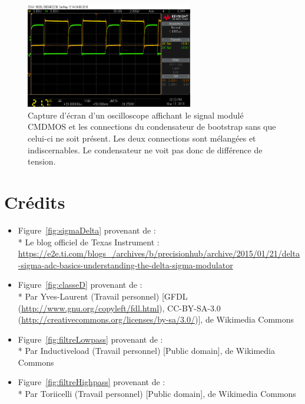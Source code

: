 \documentclass[10pt, oneside, a4paper]{article}
\begin{document}
\begin{figure}[p]
	\centering
	\includegraphics[width=0.65\textwidth]{image/12-05/scope_10.png}
	\caption{Capture d'écran d'un oscilloscope affichant le signal modulé CMDMOS et les
			 connections du condensateur de bootstrap sans que celui-ci ne soit présent.
			 Les deux connections sont mélangées et indiscernables.
			 Le condensateur ne voit pas donc de différence de tension.}
	\label{fig:scope-10}
\end{figure}


\pagebreak
{}
\section*{Crédits}

\begin{itemize}
\item Figure~\ref{fig:sigmaDelta} provenant de :\\*
Le blog officiel de Texas Instrument :
\url{https://e2e.ti.com/blogs_/archives/b/precisionhub/archive/2015/01/21/delta-sigma-adc-basics-understanding-the-delta-sigma-modulator}

\item Figure~\ref{fig:classeD} provenant de :\\*
Par Yves-Laurent (Travail personnel) [GFDL (\url{http://www.gnu.org/copyleft/fdl.html}),
CC-BY-SA-3.0 (\url{http://creativecommons.org/licenses/by-sa/3.0/})], de Wikimedia Commons

\item Figure~\ref{fig:filtreLowpass} provenant de :\\*
Par Inductiveload (Travail personnel) [Public domain], de Wikimedia Commons

\item Figure~\ref{fig:filtreHighpass} provenant de :\\*
Par Toriicelli (Travail personnel) [Public domain], de Wikimedia Commons
\end{itemize}
\end{document}
